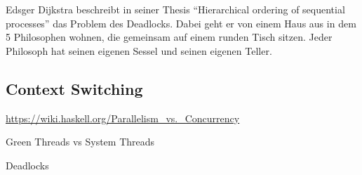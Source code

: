 Edsger Dijkstra beschreibt in seiner Thesis ``Hierarchical ordering of sequential processes'' das Problem des Deadlocks. Dabei geht er von einem Haus aus in dem 5 Philosophen wohnen, die gemeinsam auf einem runden Tisch sitzen. Jeder Philosoph hat seinen eigenen Sessel und seinen eigenen Teller. 



\cite[p. 21]{dij71}




\subsection{Context Switching}



\url{https://wiki.haskell.org/Parallelism_vs._Concurrency}

Green Threads vs System Threads

Deadlocks